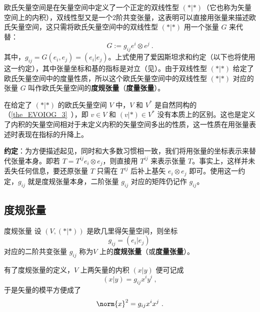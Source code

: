 
欧氏矢量空间是在矢量空间中定义了一个正定的双线性型 $(*|*)$（它也称为矢量空间上的内积），双线性型又是一个2阶共变张量，这表明可以直接用张量来描述欧氏矢量空间，这只需将欧氏矢量空间中的双线性型 $(*|*)$ 用一个张量 $G$ 来代替：
\begin{equation}
G:=g_{ij} e^i\otimes e^j~.
\end{equation}
其中，$g_{ij}=G(e_i,e_j)=(e_i|e_j)$。上式使用了爱因斯坦求和约定（以下也将使用这一约定），其中张量坐标和基的指标是对立（见）。由于双线性型 $(*|*)$ 给定了欧氏矢量空间中的度量性质，所以这个欧氏矢量空间中的双线性型 $(*|*)$ 对应的张量 $G$ 叫作欧氏矢量空间的\textbf{度规张量}（\textbf{度量张量}）。

在给定了 $(*|*)$ 的欧氏矢量空间 $V$ 中，$V$ 和 $V^*$ 是自然同构的（\autoref{the_EVOIOG_3}~），即 $v\in V $ 和 $(v|*)\in V^*$ 没有本质上的区别。这也是定义了内积的矢量空间相对于未定义内积的矢量空间多出的性质，这一性质在用张量表述时表现在指标的升降上。

\textbf{约定}：为方便描述起见，同时和大多数习惯相一致，我们将用张量的坐标表示来替代张量本身。即若 $T=T^{ij} e_{i}\otimes e_{j}$，则直接用 $T^{ij}$ 来表示张量 $T$。事实上，这样并未丢失任何信息，要还原张量 $T$ 只需在 $T^{ij}$ 后补上基矢 $e_{i}\otimes e_{j}$ 即可。使用这一约定，$g_{ij}$ 就是度规张量本身，二阶张量 $g_{ij}$ 对应的矩阵仍记作 $g_{ij}$。
\subsection{度规张量}
\begin{definition}{度规张量}
设 $(V,(*|*))$ 是欧几里得矢量空间，则坐标
\begin{equation}
g_{ij}=(e_i|e_j)~
\end{equation}
对应的二阶共变张量 $g_{ij}$ 称为$V$ 上的\textbf{度规张量}（或\textbf{度量张量}）。
\end{definition}
有了度规张量的定义，$V$ 上两矢量的内积 $(x|y)$ 便可记成
\begin{equation}
(x|y)=g_{ij}x^i y^i~,
\end{equation}
于是矢量的模平方便成了
\begin{equation}
\norm{x}^2=g_{ij}x^i x^j~.
\end{equation}

